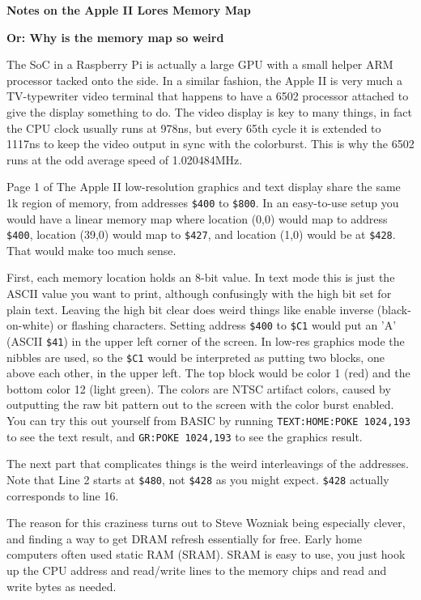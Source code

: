 \documentclass{article}
\begin{document}
\begin{center}
\begin{large}
{\bf Notes on the Apple II Lores Memory Map}
\end{large}

{\bf Or: Why is the memory map so weird}
\end{center}
The SoC in a Raspberry Pi is actually a large GPU with a small
helper ARM processor tacked onto the side.
In a similar fashion, the Apple II is very much
a TV-typewriter video terminal that happens to have a 6502
processor attached to give the display something to do.
The video display is key to many things, in fact the CPU clock
usually runs at 978ns, but every 65th cycle
it is extended to 1117ns to keep the video output in sync with the colorburst.
This is why the 6502 runs at the odd average speed of 1.020484MHz.

Page 1 of The Apple II low-resolution graphics and text display share
the same 1k region of memory, from addresses {\tt \$400} to  {\tt \$800}.
In an easy-to-use setup you would have a linear memory map where
location (0,0) would map to address {\tt \$400}, location (39,0) would map
to {\tt \$427}, and location (1,0) would be at {\tt \$428}.
That would make too much sense.

First, each memory location holds an 8-bit value. 
In text mode this is just the ASCII value you want to print,
although confusingly with the high bit set for plain text.
Leaving the high bit clear does weird things like enable inverse 
(black-on-white) or flashing characters.
Setting address {\tt \$400} to {\tt \$C1}
would put an 'A' (ASCII {\tt \$41})
in the upper left corner of the screen.
In low-res graphics mode the nibbles are used, so the {\tt \$C1} would
be interpreted as putting two blocks, one above each other, in the upper
left.
The top block would be color 1 (red) and the bottom color 12 (light green).
The colors are NTSC artifact colors, caused by outputting the raw bit
pattern out to the screen with the color burst enabled.
You can try this out yourself from BASIC by running 
{\tt TEXT:HOME:POKE 1024,193} to see the text result, and
{\tt GR:POKE 1024,193} to see the graphics result.

The next part that complicates things is the weird interleavings of
the addresses.
Note that Line 2 starts at {\tt \$480}, not {\tt \$428} as you might expect.
{\tt \$428} actually corresponds to line 16.

The reason for this craziness turns out to Steve Wozniak being especially 
clever, and finding a way to get DRAM refresh essentially for free.
Early home computers often used static RAM (SRAM).
SRAM is easy to use, you just hook up the CPU address and read/write lines
to the memory chips and read and write bytes as needed.
\end{document}
